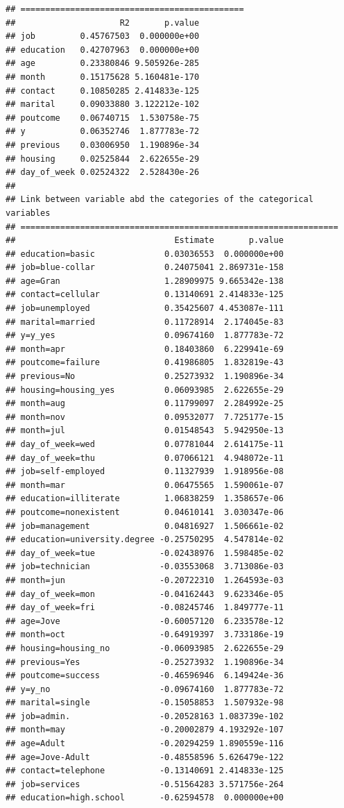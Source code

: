 \documentclass[
]{article}
\begin{document}
\begin{verbatim}
## =============================================
##                     R2       p.value
## job         0.45767503  0.000000e+00
## education   0.42707963  0.000000e+00
## age         0.23380846 9.505926e-285
## month       0.15175628 5.160481e-170
## contact     0.10850285 2.414833e-125
## marital     0.09033880 3.122212e-102
## poutcome    0.06740715  1.530758e-75
## y           0.06352746  1.877783e-72
## previous    0.03006950  1.190896e-34
## housing     0.02525844  2.622655e-29
## day_of_week 0.02524322  2.528430e-26
## 
## Link between variable abd the categories of the categorical variables
## ================================================================
##                                Estimate       p.value
## education=basic              0.03036553  0.000000e+00
## job=blue-collar              0.24075041 2.869731e-158
## age=Gran                     1.28909975 9.665342e-138
## contact=cellular             0.13140691 2.414833e-125
## job=unemployed               0.35425607 4.453087e-111
## marital=married              0.11728914  2.174045e-83
## y=y_yes                      0.09674160  1.877783e-72
## month=apr                    0.18403860  6.229941e-69
## poutcome=failure             0.41986805  1.832819e-43
## previous=No                  0.25273932  1.190896e-34
## housing=housing_yes          0.06093985  2.622655e-29
## month=aug                    0.11799097  2.284992e-25
## month=nov                    0.09532077  7.725177e-15
## month=jul                    0.01548543  5.942950e-13
## day_of_week=wed              0.07781044  2.614175e-11
## day_of_week=thu              0.07066121  4.948072e-11
## job=self-employed            0.11327939  1.918956e-08
## month=mar                    0.06475565  1.590061e-07
## education=illiterate         1.06838259  1.358657e-06
## poutcome=nonexistent         0.04610141  3.030347e-06
## job=management               0.04816927  1.506661e-02
## education=university.degree -0.25750295  4.547814e-02
## day_of_week=tue             -0.02438976  1.598485e-02
## job=technician              -0.03553068  3.713086e-03
## month=jun                   -0.20722310  1.264593e-03
## day_of_week=mon             -0.04162443  9.623346e-05
## day_of_week=fri             -0.08245746  1.849777e-11
## age=Jove                    -0.60057120  6.233578e-12
## month=oct                   -0.64919397  3.733186e-19
## housing=housing_no          -0.06093985  2.622655e-29
## previous=Yes                -0.25273932  1.190896e-34
## poutcome=success            -0.46596946  6.149424e-36
## y=y_no                      -0.09674160  1.877783e-72
## marital=single              -0.15058853  1.507932e-98
## job=admin.                  -0.20528163 1.083739e-102
## month=may                   -0.20002879 4.193292e-107
## age=Adult                   -0.20294259 1.890559e-116
## age=Jove-Adult              -0.48558596 5.626479e-122
## contact=telephone           -0.13140691 2.414833e-125
## job=services                -0.51564283 3.571756e-264
## education=high.school       -0.62594578  0.000000e+00
\end{verbatim}
\end{document}
